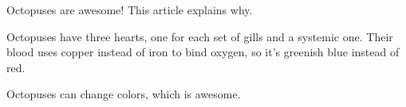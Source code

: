 Octopuses are awesome!
This article explains why.


Octopuses have three hearts, one for each set of gills and a systemic one.
Their blood uses copper instead of iron to bind oxygen, so it's greenish blue instead of red.


Octopuses can change colors, which is awesome.

